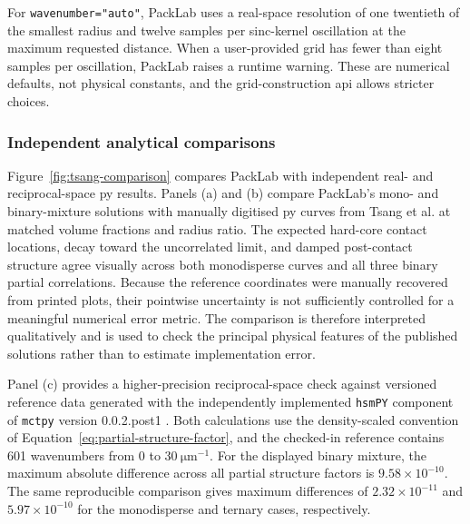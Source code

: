 \documentclass[preprint,12pt]{elsarticle}
\begin{document}
For \texttt{wavenumber="auto"}, PackLab uses a real-space resolution of one twentieth of the smallest radius and twelve samples per sinc-kernel oscillation at the maximum requested distance. %
When a user-provided grid has fewer than eight samples per oscillation, PackLab raises a runtime warning. %
These are numerical defaults, not physical constants, and the grid-construction \gls{api} allows stricter choices. %

\subsubsection{Independent analytical comparisons}

Figure~\ref{fig:tsang-comparison} compares PackLab with independent real- and reciprocal-space \gls{py} results. %
Panels (a) and (b) compare PackLab's mono- and binary-mixture solutions with manually digitised \gls{py} curves from Tsang et al. \cite{Tsang2001} at matched volume fractions and radius ratio. %
The expected hard-core contact locations, decay toward the uncorrelated limit, and damped post-contact structure agree visually across both monodisperse curves and all three binary partial correlations. %
Because the reference coordinates were manually recovered from printed plots, their pointwise uncertainty is not sufficiently controlled for a meaningful numerical error metric. %
The comparison is therefore interpreted qualitatively and is used to check the principal physical features of the published solutions rather than to estimate implementation error. %

Panel (c) provides a higher-precision reciprocal-space check against versioned reference data generated with the independently implemented \texttt{hsmPY} component of \texttt{mctpy} version 0.0.2.post1 \cite{MctpyStructureFactors}. %
Both calculations use the density-scaled convention of Equation~\ref{eq:partial-structure-factor}, and the checked-in reference contains 601 wavenumbers from 0 to $30~\mathrm{\mu m}^{-1}$. %
For the displayed binary mixture, the maximum absolute difference across all partial structure factors is $9.58\times10^{-10}$. %
The same reproducible comparison gives maximum differences of $2.32\times10^{-11}$ and $5.97\times10^{-10}$ for the monodisperse and ternary cases, respectively. %

\FloatBarrier
\end{document}
